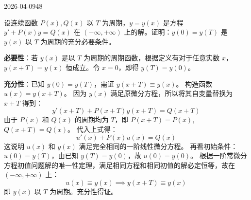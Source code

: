 \begin{mistake}{2026-04-09}{48}

\begin{problemcontent}
设连续函数 \( P(x), Q(x) \) 以 \( T \) 为周期，\( y = y(x) \) 是方程 \( y' + P(x)y = Q(x) \) 在 \( (-\infty, +\infty) \) 上的解。证明：\( y(0) = y(T) \) 是 \( y(x) \) 以 \( T \) 为周期的充分必要条件。
\end{problemcontent}

\begin{solutioncontent}
\textbf{必要性}：若 \( y(x) \) 是以 \( T \) 为周期的周期函数，根据定义有对于任意实数 \( x \)，\( y(x+T) = y(x) \) 恒成立。令 \( x = 0 \)，即得 \( y(T) = y(0) \)。

\textbf{充分性}：已知 \( y(0) = y(T) \)，需证 \( y(x+T) \equiv y(x) \)。
构造函数 \( u(x) = y(x+T) \)。
因为 \( y(x) \) 满足原微分方程，所以将其自变量替换为 \( x+T \) 得到：
\[ y'(x+T) + P(x+T)y(x+T) = Q(x+T) \]
由于 \( P(x) \) 和 \( Q(x) \) 的周期均为 \( T \)，即 \( P(x+T) = P(x) \), \( Q(x+T) = Q(x) \)。
代入上式得：
\[ u'(x) + P(x)u(x) = Q(x) \]
这说明 \( u(x) \) 和 \( y(x) \) 满足完全相同的一阶线性微分方程。
再看初始条件：
\( u(0) = y(T) \)，由已知 \( y(T) = y(0) \)，故 \( u(0) = y(0) \)。
根据一阶常微分方程初值问题解的唯一性定理，满足相同方程和相同初值的解必定恒等，故在 \(( -\infty, +\infty )\) 上：
\[ u(x) \equiv y(x) \implies y(x+T) \equiv y(x) \]
即 \( y(x) \) 以 \( T \) 为周期。充分性得证。
\end{solutioncontent}


\end{mistake}
